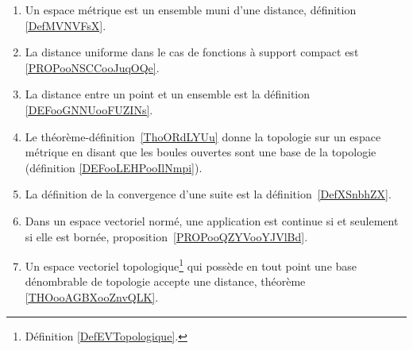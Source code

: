 	\label{THEMEooEspacesMetriquesNormes}
\begin{enumerate}
	\item
	      Un espace métrique est un ensemble muni d'une distance, définition \ref{DefMVNVFsX}.
	\item
	      La distance uniforme dans le cas de fonctions à support compact est \ref{PROPooNSCCooJuqOQe}.
	\item
	      La distance entre un point et un ensemble est la définition \ref{DEFooGNNUooFUZINs}.
	\item
	      Le théorème-définition~\ref{ThoORdLYUu} donne la topologie sur un espace métrique en disant que les boules ouvertes sont une base de la topologie (définition \ref{DEFooLEHPooIlNmpi}).
	\item
	      La définition de la convergence d'une suite est la définition~\ref{DefXSnbhZX}.
	\item
	      Dans un espace vectoriel normé, une application est continue si et seulement si elle est bornée, proposition~\ref{PROPooQZYVooYJVlBd}.
	\item
	      Un espace vectoriel topologique\footnote{Définition \ref{DefEVTopologique}.} qui possède en tout point une base dénombrable de topologie accepte une distance, théorème \ref{THOooAGBXooZnvQLK}.
\end{enumerate}
